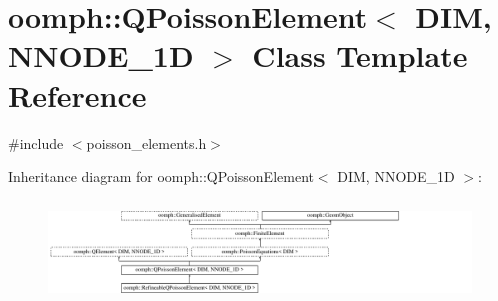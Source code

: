 \hypertarget{classoomph_1_1QPoissonElement}{}\section{oomph\+:\+:Q\+Poisson\+Element$<$ D\+IM, N\+N\+O\+D\+E\+\_\+1D $>$ Class Template Reference}
\label{classoomph_1_1QPoissonElement}


{\ttfamily \#include $<$poisson\+\_\+elements.\+h$>$}

Inheritance diagram for oomph\+:\+:Q\+Poisson\+Element$<$ D\+IM, N\+N\+O\+D\+E\+\_\+1D $>$\+:\begin{figure}[H]
\begin{center}
\leavevmode
\includegraphics[height=2.705314cm]{classoomph_1_1QPoissonElement}
\end{center}
\end{figure}
